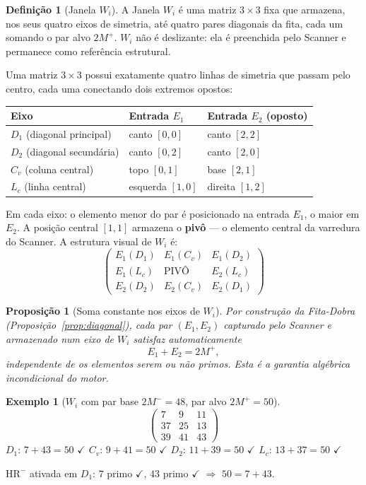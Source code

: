 \documentclass[12pt,a4paper]{article}
\newtheorem{proposition}[theorem]{Proposição}
\theoremstyle{definition}
\newtheorem{definition}[theorem]{Definição}
\newtheorem{example}[theorem]{Exemplo}
\newcommand{\HRm}{\mathrm{HR}^{-}}
\begin{document}
	\begin{definition}[Janela $W_i$]
		\label{def:wi}
		A Janela $W_i$ é uma matriz $3 \times 3$ fixa que armazena, nos
		seus quatro eixos de simetria, até quatro pares diagonais da
		fita, cada um somando o par alvo $2M^+$. $W_i$ não é deslizante:
		ela é preenchida pelo Scanner e permanece como referência
		estrutural.
		
		Uma matriz $3 \times 3$ possui exatamente quatro linhas de simetria
		que passam pelo centro, cada uma conectando dois extremos opostos:
		\begin{center}
			\renewcommand{\arraystretch}{1.3}
			\begin{tabular}{lll}
				\toprule
				\textbf{Eixo} & \textbf{Entrada $E_1$} & \textbf{Entrada $E_2$ (oposto)} \\
				\midrule
				$D_1$ (diagonal principal) & canto $[0,0]$ & canto $[2,2]$ \\
				$D_2$ (diagonal secundária) & canto $[0,2]$ & canto $[2,0]$ \\
				$C_v$ (coluna central) & topo $[0,1]$ & base $[2,1]$ \\
				$L_c$ (linha central) & esquerda $[1,0]$ & direita $[1,2]$ \\
				\bottomrule
			\end{tabular}
		\end{center}
		Em cada eixo: o elemento menor do par é posicionado na entrada
		$E_1$, o maior em $E_2$. A posição central $[1,1]$ armazena o
		\textbf{pivô} — o elemento central da varredura do Scanner.
		A estrutura visual de $W_i$ é:
		\[
		\begin{pmatrix}
			E_1(D_1) & E_1(C_v) & E_1(D_2) \\
			E_1(L_c) & \text{PIV\^O} & E_2(L_c) \\
			E_2(D_2) & E_2(C_v) & E_2(D_1)
		\end{pmatrix}
		\]
	\end{definition}
	
	\begin{proposition}[Soma constante nos eixos de $W_i$]
		\label{prop:eixos}
		Por construção da Fita-Dobra (Proposição~\ref{prop:diagonal}),
		cada par $(E_1, E_2)$ capturado pelo Scanner e armazenado num
		eixo de $W_i$ satisfaz automaticamente
		\[
		E_1 + E_2 = 2M^+,
		\]
		independente de os elementos serem ou não primos. Esta é a
		garantia algébrica incondicional do motor.
	\end{proposition}
	
	\begin{example}[$W_i$ com par base $2M^- = 48$, par alvo $2M^+ = 50$]
		\[
		\begin{pmatrix}
			7  &  9 & 11 \\
			37 & 25 & 13 \\
			39 & 41 & 43
		\end{pmatrix}
		\]
		$D_1$: $7 + 43 = 50$ $\checkmark$\quad
		$C_v$: $9 + 41 = 50$ $\checkmark$\quad
		$D_2$: $11 + 39 = 50$ $\checkmark$\quad
		$L_c$: $13 + 37 = 50$ $\checkmark$
		
		$\HRm$ ativada em $D_1$: $7$ primo $\checkmark$,
		$43$ primo $\checkmark$ $\Rightarrow$ $50 = 7 + 43$.
	\end{example}
	
\end{document}
